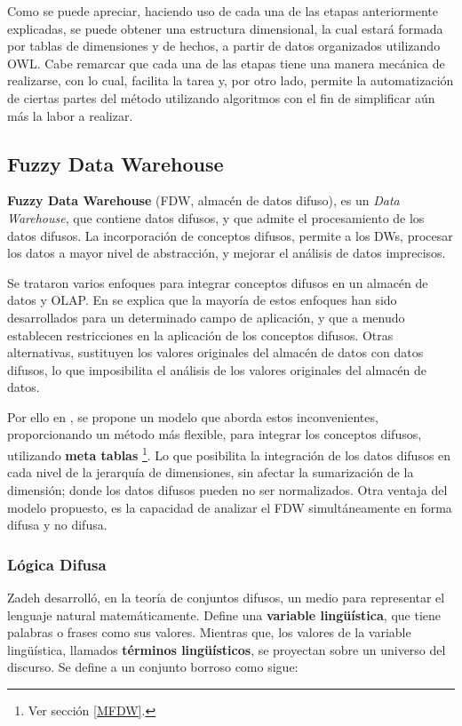 \documentclass[a4paper,11pt]{article}
\begin{document}
    
    Como se puede apreciar, haciendo uso de cada una de las etapas anteriormente explicadas, se puede obtener una estructura dimensional, la cual estará
    formada por tablas de dimensiones y de hechos, a partir de datos organizados utilizando OWL. Cabe remarcar que cada una de las etapas tiene una manera
    mecánica de realizarse, con lo cual, facilita la tarea y, por otro lado, permite la automatización de ciertas partes del método utilizando algoritmos con el
    fin de simplificar aún más la labor a realizar.
    
    \subsection{Fuzzy Data Warehouse}
    
    \textbf{Fuzzy Data Warehouse} (FDW, almacén de datos difuso), es un \textit{Data Warehouse}, que contiene datos difusos, y que admite el procesamiento
    de los datos difusos.
    La incorporación de conceptos difusos, permite a los DWs, procesar los datos a mayor nivel de abstracción, y mejorar el análisis de datos imprecisos.
    
    Se trataron varios enfoques para integrar conceptos difusos en un almacén de datos y OLAP. 
    En \cite{Fasel14} se explica que la mayoría de estos enfoques han sido desarrollados para un determinado campo de aplicación, y que a menudo establecen
    restricciones en la aplicación de los conceptos difusos.
    Otras alternativas, sustituyen los valores originales del almacén de datos con datos difusos, lo que imposibilita el análisis de los valores originales del
    almacén de datos.
    
    Por ello en \cite{Fasel14}, se propone un modelo que aborda estos inconvenientes, proporcionando un método más flexible, para integrar los conceptos difusos,
    utilizando \textbf{meta tablas} \footnote{Ver sección \ref{MFDW}.}.
    Lo que posibilita la integración de los datos difusos en cada nivel de la jerarquía de dimensiones, sin afectar la sumarización de la dimensión; donde los datos
    difusos pueden no ser normalizados. 
    Otra ventaja del modelo propuesto, es la capacidad de analizar el FDW simultáneamente en forma difusa y no difusa.
    
    \subsubsection{Lógica Difusa}
    
    Zadeh desarrolló, en la teoría de conjuntos difusos, un medio para representar el lenguaje natural matemáticamente. Define una \textbf{variable lingüística},
    que tiene  palabras o frases como sus valores. Mientras que, los valores de la variable lingüística, llamados \textbf{términos lingüísticos}, se proyectan sobre un universo
    del discurso.
    Se define a un conjunto borroso como sigue:
        
\end{document}
